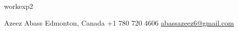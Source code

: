 \documentclass[a4paper]{modernsimplecv}
\begin{document}
    \pagebreak

    \begin{minipage}[t]{\textwidth}

        \vspace{1em}
        {workexp2}
 
  
        \vspace{1em}
    \end{minipage}



    \vspace{1em} %
    \setlength{\parindent}{0pt}
    \begin{minipage}[t]{\textwidth}
        \begin{center}\fontfamily{\sfdefault}\selectfont \color{black!70}
            {\small Azeez Abass  Edmonton, Canada  +1 780 720 4606 
             \protect\url{abassazeez6@gmail.com}
            }
        \end{center}
    \end{minipage}
\end{document}
